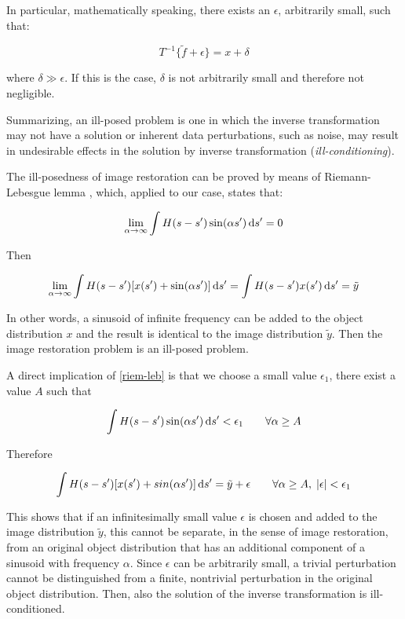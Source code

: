In particular, mathematically speaking, there exists an $\epsilon$, arbitrarily small, such that:

$$T^{-1} \{\tilde{f}+\epsilon\} = x + \delta$$

where $\delta \gg \epsilon$. If this is the case, $\delta$ is not arbitrarily small and therefore not negligible.

Summarizing, an ill-posed problem is one in which the inverse transformation may not have a solution or inherent data perturbations, such as noise, may result in undesirable effects in the solution by inverse transformation (\emph{ill-conditioning}).

The ill-posedness of image restoration can be proved by means of Riemann-Lebesgue lemma \citep{hunt}, which, applied to our case, states that:

$$\lim_{\alpha \to \infty} \int H(s-s') \sin(\alpha s') \, \mathrm{d} s' = 0$$

Then

\begin{align}
\label{riem-leb}
\lim_{\alpha \to \infty} \int H(s-s') [x(s') + \sin(\alpha s')] \, \mathrm{d} s' = \int H(s-s') x(s') \, \mathrm{d} s' = \tilde{y}
\end{align}

In other words, a sinusoid of infinite frequency can be added to the object distribution $x$ and the result is identical to the image distribution $\tilde{y}$.  Then the image restoration problem is an ill-posed problem.

A direct implication of \eqref{riem-leb} is that we choose a small value $\epsilon_1$, there exist a value $A$ such that

$$\int H(s-s') \sin(\alpha s') \, \mathrm{d} s' < \epsilon_1 \qquad \forall \alpha \geq A$$

Therefore

$$ \int H(s-s')[x(s') + sin(\alpha s')] \, \mathrm{d} s' = \tilde{y} + \epsilon\qquad \forall \alpha \geq A,\; |\epsilon| < \epsilon_1$$

This shows that if an infinitesimally small value $\epsilon$ is chosen and added to the image distribution $\tilde{y}$, this cannot be separate, in the sense of image restoration, from an original object distribution that has an additional component of a sinusoid with frequency $\alpha$. Since $\epsilon$ can be arbitrarily small, a trivial perturbation cannot be distinguished from a finite, nontrivial perturbation in the original object distribution. Then, also the solution of the inverse transformation is ill-conditioned.

